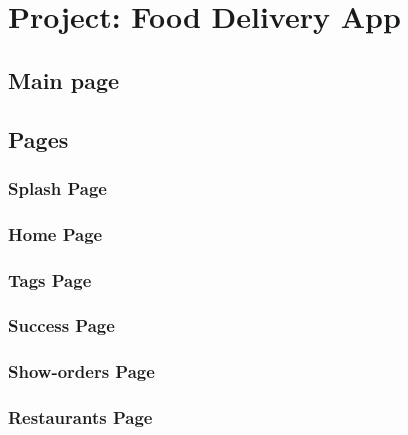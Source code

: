 \chapter{Project: Food Delivery App}
\section{Main page}

\section{Pages}
\subsection{Splash Page}

\subsection{Home Page}

\subsection{Tags Page}

\subsection{Success Page}

\subsection{Show-orders Page}

\subsection{Restaurants Page}

